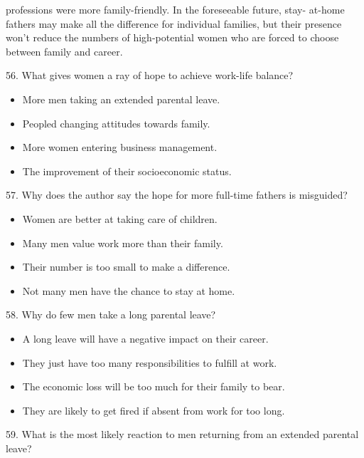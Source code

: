 \documentclass[UTF8,11pt]{ctexart}
\begin{document}
professions were more family-friendly. In the foreseeable future, stay- at-home fathers may make all the difference for individual families, but their presence won’t reduce the numbers of high-potential women who are forced to choose between family and career.


56. What gives women a ray of hope to achieve work-life balance?


\begin{itemize}[leftmargin=2em,itemsep=.2em,topsep=.4em]\item[A.] More men taking an extended parental leave.
\item[B.] Peopled changing attitudes towards family.
\item[C.] More women entering business management.
\item[D.] The improvement of their socioeconomic status.
\end{itemize}

57. Why does the author say the hope for more full-time fathers is misguided?


\begin{itemize}[leftmargin=2em,itemsep=.2em,topsep=.4em]\item[A.] Women are better at taking care of children.
\end{itemize}

\begin{itemize}[leftmargin=2em,itemsep=.2em,topsep=.4em]\item[B.] Many men value work more than their family.
\item[C.] Their number is too small to make a difference.
\item[D.] Not many men have the chance to stay at home.
\end{itemize}

58. Why do few men take a long parental leave?


\begin{itemize}[leftmargin=2em,itemsep=.2em,topsep=.4em]\item[A.] A long leave will have a negative impact on their career.
\item[B.] They just have too many responsibilities to fulfill at work.
\item[C.] The economic loss will be too much for their family to bear.
\item[D.] They are likely to get fired if absent from work for too long.
\end{itemize}

59. What is the most likely reaction to men returning from an extended parental leave?
\end{document}
